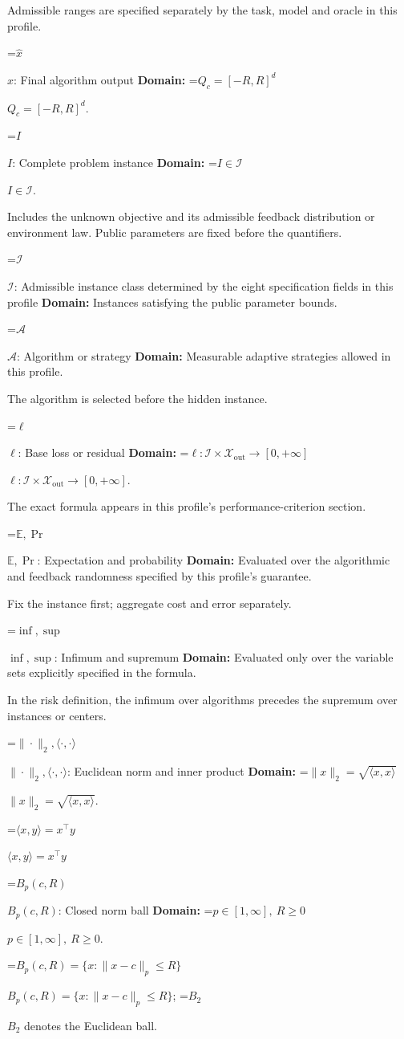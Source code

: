 \documentclass[10pt,a4paper]{article}
\newcommand{\AtlasMath}[1]{\par\begingroup\centering\setbox0=\hbox{$\displaystyle #1$}\ifdim\wd0>1.4\linewidth\typeout{ATLAS WIDE FORMULA: \the\wd0}\fi\ifdim\wd0>\linewidth\resizebox{\linewidth}{!}{\box0}\else\box0\fi\par\endgroup}
\newcommand{\AtlasInlineMath}[1]{\begingroup\setbox0=\hbox{$#1$}\ifdim\wd0>.4\linewidth\endgroup\AtlasMath{#1}\else\endgroup$#1$\fi}
\begin{document}
Admissible ranges are specified separately by the task, model and oracle in this profile.

\AtlasInlineMath{\widehat{x}}: Final algorithm output \textbf{Domain:} \AtlasInlineMath{Q_c=[-R,R]^d}.

\AtlasInlineMath{I}: Complete problem instance \textbf{Domain:} \AtlasInlineMath{I\in\mathcal{I}}.

Includes the unknown objective and its admissible feedback distribution or environment law. Public parameters are fixed before the quantifiers.

\AtlasInlineMath{\mathcal{I}}: Admissible instance class determined by the eight specification fields in this profile \textbf{Domain:} Instances satisfying the public parameter bounds.

\AtlasInlineMath{\mathcal{A}}: Algorithm or strategy \textbf{Domain:} Measurable adaptive strategies allowed in this profile.

The algorithm is selected before the hidden instance.

\AtlasInlineMath{\ell}: Base loss or residual \textbf{Domain:} \AtlasInlineMath{\ell:\mathcal{I}\times\mathcal{X}_{\mathrm{out}}\to[0,+\infty]}.

The exact formula appears in this profile's performance-criterion section.

\AtlasInlineMath{\mathbb{E},\Pr}: Expectation and probability \textbf{Domain:} Evaluated over the algorithmic and feedback randomness specified by this profile's guarantee.

Fix the instance first; aggregate cost and error separately.

\AtlasInlineMath{\inf,\sup}: Infimum and supremum \textbf{Domain:} Evaluated only over the variable sets explicitly specified in the formula.

In the risk definition, the infimum over algorithms precedes the supremum over instances or centers.

\AtlasInlineMath{\|\cdot\|_2,\langle\cdot,\cdot\rangle}: Euclidean norm and inner product \textbf{Domain:} \AtlasInlineMath{\|x\|_2=\sqrt{\langle x,x\rangle}}.

\AtlasInlineMath{\langle x,y\rangle=x^\top y}

\AtlasInlineMath{B_p(c,R)}: Closed norm ball \textbf{Domain:} \AtlasInlineMath{p\in[1,\infty],\ R\ge0}.

\AtlasInlineMath{B_p(c,R)=\{x:\|x-c\|_p\le R\}}; \AtlasInlineMath{B_2} denotes the Euclidean ball.
\end{document}
